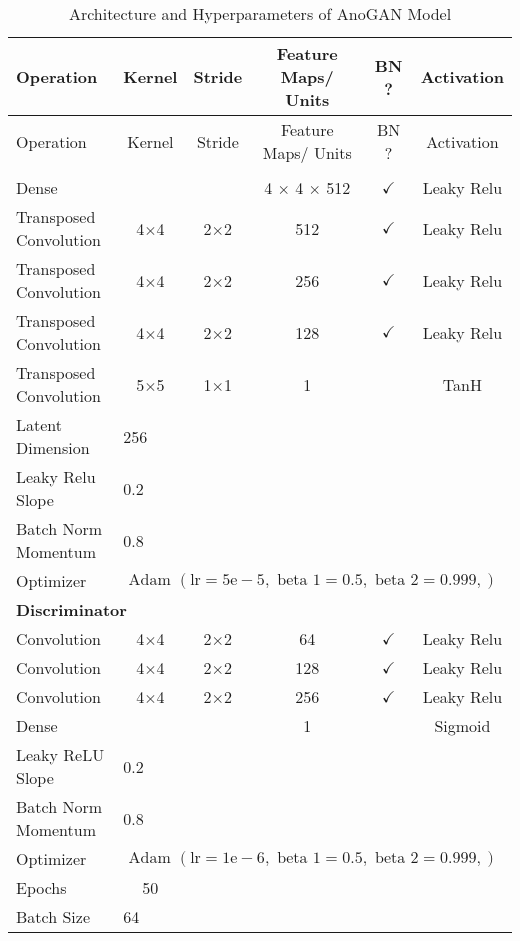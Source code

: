 \footnotesize
\begin{longtable}[c]{@{}lccccc@{}}
	\caption{Architecture and Hyperparameters of AnoGAN Model}
	\label{tab:anogan_imp}\\
	\toprule
	Operation & Kernel & Stride & Feature Maps/ Units & BN ? & Activation \\* \midrule
	\endfirsthead
	\toprule
	Operation & Kernel & Stride & Feature Maps/ Units & BN ? & Activation \\* \midrule
	\endhead
	\bottomrule
	\endfoot
	\endlastfoot
	\multicolumn{6}{l}{\textbf{Generator}} \\
	Dense & \multicolumn{1}{c}{} &  & 4 $\times$ 4 $\times$ 512 & $\checkmark$ & Leaky Relu \\
	Transposed Convolution & \multicolumn{1}{c}{4$\times$4} & 2$\times$2 & 512 & $\checkmark$ & Leaky Relu \\
	Transposed Convolution & \multicolumn{1}{c}{4$\times$4} & 2$\times$2 & 256 & $\checkmark$ & Leaky Relu \\
	Transposed Convolution & \multicolumn{1}{c}{4$\times$4} & 2$\times$2 & 128 & $\checkmark$ & Leaky Relu \\
	Transposed Convolution & \multicolumn{1}{c}{5$\times$5} & 1$\times$1 & 1 &  & TanH \\ \hline
	Latent Dimension & \multicolumn{5}{l}{256} \\
	Leaky Relu Slope & \multicolumn{5}{l}{0.2} \\
	Batch Norm Momentum & \multicolumn{5}{l}{0.8} \\
	Optimizer & \multicolumn{5}{l}{$\text { Adam }(\mathrm{lr}=5 \mathrm{e}-5, \text { beta } 1=0.5, \text { beta } 2=0.999,)$} \\ \hline
	\multicolumn{6}{l}{\textbf{Discriminator}} \\
	Convolution & \multicolumn{1}{c}{4$\times$4} & 2$\times$2 & 64 & $\checkmark$ & Leaky Relu \\
	Convolution & \multicolumn{1}{c}{4$\times$4} & 2$\times$2 & 128 & $\checkmark$ & Leaky Relu \\
	Convolution & \multicolumn{1}{c}{4$\times$4} & 2$\times$2 & 256 & $\checkmark$ & Leaky Relu \\
	Dense & \multicolumn{1}{c}{} &  & 1 &  & Sigmoid \\ \hline
	Leaky ReLU Slope & \multicolumn{5}{l}{0.2} \\
	Batch Norm Momentum & \multicolumn{5}{l}{0.8} \\
	Optimizer & \multicolumn{5}{l}{$\text { Adam }(\mathrm{lr}=1 \mathrm{e}-6, \text { beta } 1=0.5, \text { beta } 2=0.999,)$} \\ \hline
	Epochs & 50 & \multicolumn{1}{l}{} & \multicolumn{1}{l}{} & \multicolumn{1}{l}{} & \multicolumn{1}{l}{} \\
	Batch Size & \multicolumn{5}{l}{64}
\end{longtable}

